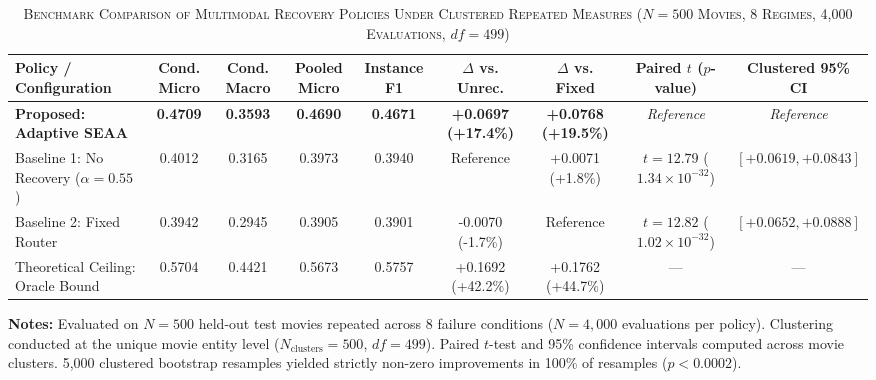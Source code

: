 \begin{table}[t]
\caption{\textsc{Benchmark Comparison of Multimodal Recovery Policies Under Clustered Repeated Measures ($N=500$ Movies, 8 Regimes, 4,000 Evaluations, $df=499$)}}
\label{tab:benchmark_comparison}
\centering
\small
\renewcommand{\arraystretch}{1.2}
\begin{tabular*}{\textwidth}{@{\extracolsep{\fill}}lcccccccc@{}}
\toprule
\textbf{Policy / Configuration} & \textbf{Cond. Micro} & \textbf{Cond. Macro} & \textbf{Pooled Micro} & \textbf{Instance F1} & \textbf{$\Delta$ vs. Unrec.} & \textbf{$\Delta$ vs. Fixed} & \textbf{Paired $t$ ($p$-value)} & \textbf{Clustered 95\% CI} \\
\midrule
\textbf{Proposed: Adaptive SEAA} & \textbf{0.4709} & \textbf{0.3593} & \textbf{0.4690} & \textbf{0.4671} & \textbf{+0.0697 (+17.4\%)} & \textbf{+0.0768 (+19.5\%)} & \textit{Reference} & \textit{Reference} \\
Baseline 1: No Recovery ($\alpha=0.55$) & 0.4012 & 0.3165 & 0.3973 & 0.3940 & Reference & +0.0071 (+1.8\%) & $t = 12.79$ ($1.34 \times 10^{-32}$) & $[+0.0619, +0.0843]$ \\
Baseline 2: Fixed Router & 0.3942 & 0.2945 & 0.3905 & 0.3901 & -0.0070 (-1.7\%) & Reference & $t = 12.82$ ($1.02 \times 10^{-32}$) & $[+0.0652, +0.0888]$ \\
\midrule
Theoretical Ceiling: Oracle Bound & 0.5704 & 0.4421 & 0.5673 & 0.5757 & +0.1692 (+42.2\%) & +0.1762 (+44.7\%) & --- & --- \\
\bottomrule
\end{tabular*}
\vspace{0.8ex}
{\raggedright \footnotesize \textbf{Notes:} Evaluated on $N=500$ held-out test movies repeated across 8 failure conditions ($N=4,000$ evaluations per policy). Clustering conducted at the unique movie entity level ($N_{\text{clusters}}=500$, $df=499$). Paired $t$-test and 95\% confidence intervals computed across movie clusters. 5,000 clustered bootstrap resamples yielded strictly non-zero improvements in 100\% of resamples ($p < 0.0002$).\par}
\end{table}
